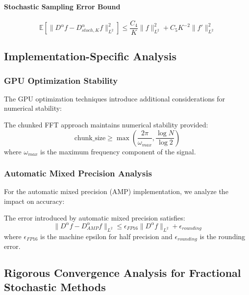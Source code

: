 \paragraph{Stochastic Sampling Error Bound}
\begin{equation}
\mathbb{E}[\|D^{\alpha} f - D^{\alpha}_{stoch,K} f\|_{L^2}^2] \leq \frac{C_4}{K} \|f\|_{L^2}^2 + C_5 K^{-2} \|f'\|_{L^2}^2
\end{equation}

\subsection{Implementation-Specific Analysis}

\subsubsection{GPU Optimization Stability}

The GPU optimization techniques introduce additional considerations for numerical stability:

\begin{theorem}
The chunked FFT approach maintains numerical stability provided:
\begin{equation}
\text{chunk\_size} \geq \max\left(\frac{2\pi}{\omega_{max}}, \frac{\log N}{\log 2}\right)
\end{equation}
where $\omega_{max}$ is the maximum frequency component of the signal.
\end{theorem}

\subsubsection{Automatic Mixed Precision Analysis}

For the automatic mixed precision (AMP) implementation, we analyze the impact on accuracy:

\begin{theorem}
The error introduced by automatic mixed precision satisfies:
\begin{equation}
\|D^{\alpha} f - D^{\alpha}_{AMP} f\|_{L^2} \leq \epsilon_{FP16} \|D^{\alpha} f\|_{L^2} + \epsilon_{rounding}
\end{equation}
where $\epsilon_{FP16}$ is the machine epsilon for half precision and $\epsilon_{rounding}$ is the rounding error.
\end{theorem}

\subsection{Rigorous Convergence Analysis for Fractional Stochastic Methods}

